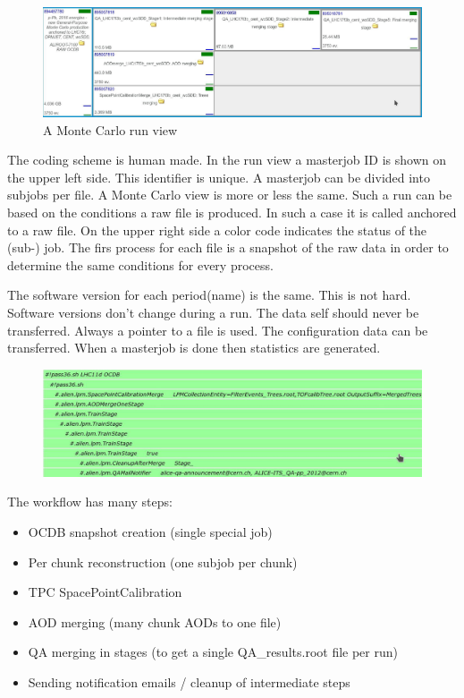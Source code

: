 \begin{figure}
  \begin{center}
    \includegraphics[scale=0.2]{./images/run_view_mc.jpg}
    \caption{A Monte Carlo run view}
    \label{fig:run_view_mc}
  \end{center}
\end{figure}

The coding scheme is human made. In the run view a masterjob ID is shown on the upper left side. This identifier is unique. A masterjob can be divided into subjobs per file. A Monte Carlo view is more or less the same. Such a run can be based on the conditions a raw file is produced. In such a case it is called anchored to a raw file. On the upper right side a color code indicates the status of the (sub-) job. The firs process for each file is a snapshot of the raw data in order to determine the same conditions for every process.

The software version for each period(name) is the same. This is not hard. Software versions don't change during a run. The data self should never be transferred. Always a pointer to a file is used. The configuration data can be transferred. When a masterjob is done then statistics are generated. 

\begin{figure}
  \begin{center}
    \includegraphics[scale=0.25]{./images/workflow.jpg}
    \caption{}
    \label{fig:}
  \end{center}
\end{figure}

The workflow has many steps:
\begin{itemize}
  \item OCDB snapshot creation (single special job)
  \item Per chunk reconstruction (one subjob per chunk)
  \item TPC SpacePointCalibration
  \item AOD merging (many chunk AODs to one file)
  \item QA merging in stages (to get a single QA\_results.root file per run)
  \item Sending notification emails / cleanup of intermediate steps
\end{itemize}

